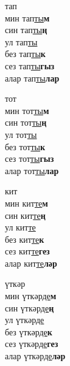 \begin{multicols}{4}
\begin{enumerate}
\begin{minipage}{\linewidth}
    \item
    тап\\
    мин тап\underline{ты}\textbf{м}\\
    син тап\underline{ты}\textbf{ң}\\
    ул тап\underline{ты}\\
    без тап\underline{ты}\textbf{к}\\
    сез тап\underline{ты}\textbf{гыз}\\
    алар тап\underline{ты}\textbf{лар}\\
\end{minipage}

\begin{minipage}{\linewidth}
    \item
    тот\\
    мин тот\underline{ты}\textbf{м}\\
    син тот\underline{ты}\textbf{ң}\\
    ул тот\underline{ты}\\
    без тот\underline{ты}\textbf{к}\\
    сез тот\underline{ты}\textbf{гыз}\\
    алар тот\underline{ты}\textbf{лар}\\
\end{minipage}

\begin{minipage}{\linewidth}
    \item
    кит\\
    мин кит\underline{те}\textbf{м}\\
    син кит\underline{те}\textbf{ң}\\
    ул кит\underline{те}\\
    без кит\underline{те}\textbf{к}\\
    сез кит\underline{те}\textbf{гез}\\
    алар кит\underline{те}\textbf{ләр}\\
\end{minipage}

\begin{minipage}{\linewidth}
    \item
    үткәр\\
    мин үткәр\underline{де}\textbf{м}\\
    син үткәр\underline{де}\textbf{ң}\\
    ул үткәр\underline{де}\\
    без үткәр\underline{де}\textbf{к}\\
    сез үткәр\underline{де}\textbf{гез}\\
    алар үткәр\underline{де}\textbf{ләр}\\
\end{minipage}


\end{enumerate}
\end{multicols}
